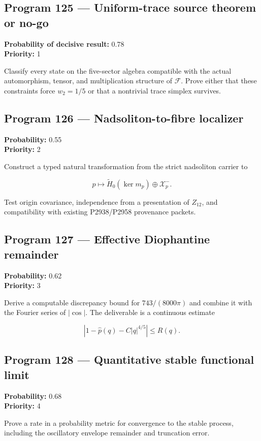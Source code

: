 \documentclass[11pt,a4paper,openany]{report}
\begin{document}
\subsection{Program 125 --- Uniform-trace source theorem or no-go}

\textbf{Probability of decisive result:} 0.78\\
\textbf{Priority:} 1

Classify every state on the five-sector algebra compatible with the actual automorphism, tensor, and multiplication structure of \(\mathcal F\). Prove either that these constraints force \(w_2=1/5\) or that a nontrivial trace simplex survives.

\subsection{Program 126 --- Nadsoliton-to-fibre localizer}

\textbf{Probability:} 0.55\\
\textbf{Priority:} 2

Construct a typed natural transformation from the strict nadsoliton carrier to

\[
p\mapsto
\widetilde H_0(\ker m_p)\oplus\mathcal X_p^-.
\]

Test origin covariance, independence from a presentation of \(Z_{12}\), and compatibility with existing P2938/\allowbreak{}P2958 provenance packets.

\subsection{Program 127 --- Effective Diophantine remainder}

\textbf{Probability:} 0.62\\
\textbf{Priority:} 3

Derive a computable discrepancy bound for \(743/(8000\pi)\) and combine it with the Fourier series of \(|\cos|\). The deliverable is a continuous estimate

\[
\left|
1-\widehat p(q)-C|q|^{4/5}
\right|
\le R(q).
\]

\subsection{Program 128 --- Quantitative stable functional limit}

\textbf{Probability:} 0.68\\
\textbf{Priority:} 4

Prove a rate in a probability metric for convergence to the stable process, including the oscillatory envelope remainder and truncation error.
\end{document}
